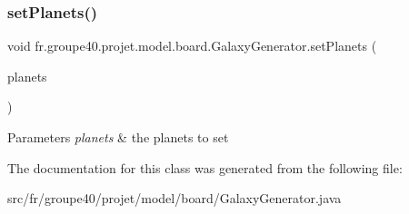 \subsubsection{\texorpdfstring{set\+Planets()}{setPlanets()}}
{\footnotesize\ttfamily void fr.\+groupe40.\+projet.\+model.\+board.\+Galaxy\+Generator.\+set\+Planets (\begin{DoxyParamCaption}\item[{Array\+List$<$ \hyperlink{classfr_1_1groupe40_1_1projet_1_1model_1_1planets_1_1_planet}{Planet} $>$}]{planets }\end{DoxyParamCaption})}


\begin{DoxyParams}{Parameters}
{\em planets} & the planets to set \\
\hline
\end{DoxyParams}


The documentation for this class was generated from the following file\+:\begin{DoxyCompactItemize}
\item 
src/fr/groupe40/projet/model/board/Galaxy\+Generator.\+java\end{DoxyCompactItemize}
